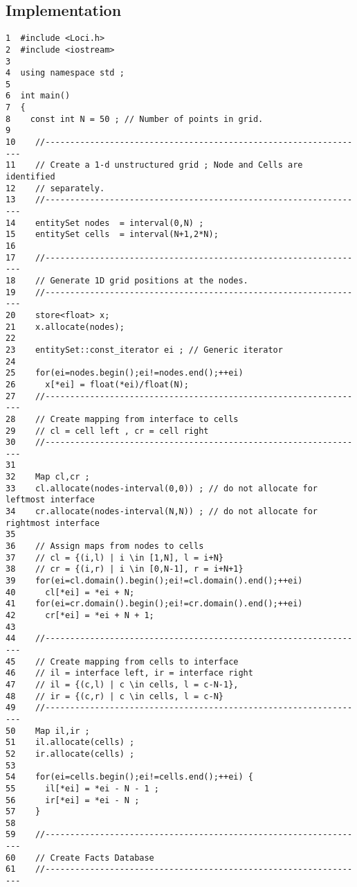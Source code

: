 \subsection { Implementation }

\begin{verbatim}
1  #include <Loci.h>
2  #include <iostream>
3
4  using namespace std ;
5
6  int main()
7  {
8    const int N = 50 ; // Number of points in grid.
9
10    //-----------------------------------------------------------------
11    // Create a 1-d unstructured grid ; Node and Cells are identified
12    // separately.
13    //-----------------------------------------------------------------
14    entitySet nodes  = interval(0,N) ;
15    entitySet cells  = interval(N+1,2*N);
16
17    //-----------------------------------------------------------------
18    // Generate 1D grid positions at the nodes.
19    //-----------------------------------------------------------------
20    store<float> x;
21    x.allocate(nodes);
22
23    entitySet::const_iterator ei ; // Generic iterator
24
25    for(ei=nodes.begin();ei!=nodes.end();++ei)
26      x[*ei] = float(*ei)/float(N);
27    //-----------------------------------------------------------------
28    // Create mapping from interface to cells
29    // cl = cell left , cr = cell right
30    //-----------------------------------------------------------------
31
32    Map cl,cr ;
33    cl.allocate(nodes-interval(0,0)) ; // do not allocate for leftmost interface
34    cr.allocate(nodes-interval(N,N)) ; // do not allocate for rightmost interface
35
36    // Assign maps from nodes to cells
37    // cl = {(i,l) | i \in [1,N], l = i+N}
38    // cr = {(i,r) | i \in [0,N-1], r = i+N+1}
39    for(ei=cl.domain().begin();ei!=cl.domain().end();++ei)
40      cl[*ei] = *ei + N;
41    for(ei=cr.domain().begin();ei!=cr.domain().end();++ei)
42      cr[*ei] = *ei + N + 1;
43
44    //-----------------------------------------------------------------
45    // Create mapping from cells to interface
46    // il = interface left, ir = interface right
47    // il = {(c,l) | c \in cells, l = c-N-1},
48    // ir = {(c,r) | c \in cells, l = c-N}
49    //-----------------------------------------------------------------
50    Map il,ir ;
51    il.allocate(cells) ;
52    ir.allocate(cells) ;
53
54    for(ei=cells.begin();ei!=cells.end();++ei) {
55      il[*ei] = *ei - N - 1 ;
56      ir[*ei] = *ei - N ;
57    }
58
59    //-----------------------------------------------------------------
60    // Create Facts Database
61    //-----------------------------------------------------------------

\end{verbatim}
